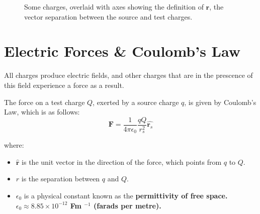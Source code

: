 \documentclass[
  letterpaper,
  DIV=11,
  numbers=noendperiod]{scrreprt}
\providecommand{\tightlist}{%
  \setlength{\itemsep}{0pt}\setlength{\parskip}{0pt}}\usepackage{longtable,booktabs,array}
\begin{document}
\begin{figure}


\caption{\label{fig-definitions}Some charges, overlaid with axes showing
the definition of \(\mathrm{\mathbf{r}}\), the vector separation between
the source and test charges.}

\end{figure}%

\section{Electric Forces \& Coulomb's
Law}\label{electric-forces-coulombs-law}

All charges produce electric fields, and other charges that are in the
prescence of this field experience a force as a result.

The force on a test charge \(Q\), exerted by a source charge \(q\), is
given by Coulomb's Law, which is as follows:
\[ \mathrm{\mathbf{F}}= \frac{1}{4\pi \epsilon_0} \frac{q Q}{r_s^2} \hat{\mathrm{\mathbf{r}}_s} \]

where:

\begin{itemize}
\tightlist
\item
  \(\hat{\mathrm{\mathbf{r}}}\) is the unit vector in the direction of
  the force, which points from \(q\) to \(Q\).
\item
  \(r\) is the separation between \(q\) and \(Q\).
\item
  \(\epsilon_0\) is a physical constant known as the
  \bf{permittivity of free space}.  $\epsilon_0 \approx 8.85 \times 10^{-12}$ Fm $^{-1}$ (farads per metre). 
\end{itemize}
\end{document}

